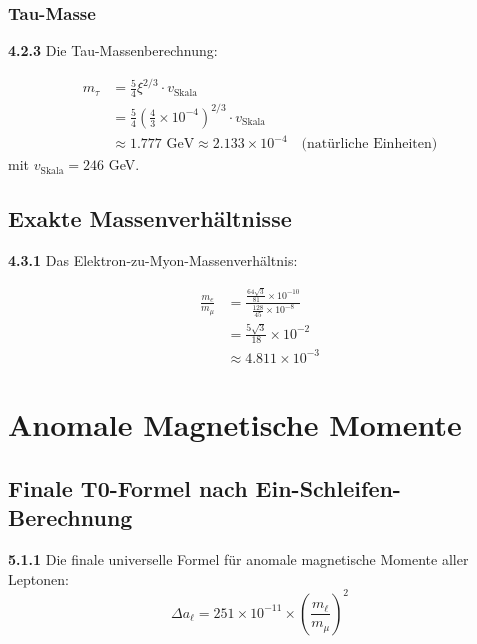 \documentclass[12pt,a4paper]{article}
\newcommand{\xipar}{\xi}
\begin{document}
	\subsubsection{Tau-Masse}
	
	\noindent \textbf{4.2.3} Die Tau-Massenberechnung:
	\begin{keyresult}
		\begin{align}
			m_\tau &= \frac{5}{4} \xipar^{2/3} \cdot v_{\text{Skala}} \\
			&= \frac{5}{4} \left( \frac{4}{3} \times 10^{-4} \right)^{2/3} \cdot v_{\text{Skala}} \\
			&\approx 1.777 \text{ GeV} \approx 2.133 \times 10^{-4} \quad \text{(natürliche Einheiten)}
		\end{align}
		mit $v_{\text{Skala}} = 246$ GeV.
	\end{keyresult}
	
	\subsection{Exakte Massenverhältnisse}
	
	\noindent \textbf{4.3.1} Das Elektron-zu-Myon-Massenverhältnis:
	\begin{keyresult}
		\begin{align}
			\frac{m_e}{m_\mu} &= \frac{\frac{64 \sqrt{3}}{81} \times 10^{-10}}{\frac{128}{45} \times 10^{-8}} \\
			&= \frac{5 \sqrt{3}}{18} \times 10^{-2} \\
			&\approx 4.811 \times 10^{-3}
		\end{align}
	\end{keyresult}


	
	\section{Anomale Magnetische Momente}
	
	\subsection{Finale T0-Formel nach Ein-Schleifen-Berechnung}
	
	\noindent \textbf{5.1.1} Die finale universelle Formel für anomale magnetische Momente aller Leptonen:
	\begin{equation}
		\boxed{\Delta a_\ell = 251 \times 10^{-11} \times \left(\frac{m_\ell}{m_\mu}\right)^2}
	\end{equation}
	
\end{document}
